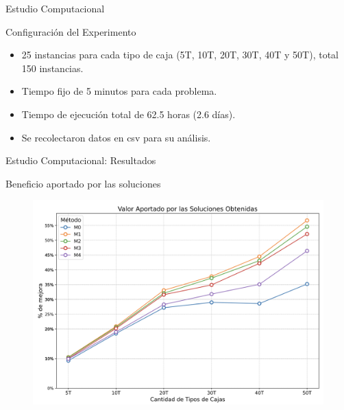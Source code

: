 \documentclass[handout]{beamer}
\begin{document}
\begin{frame}{Estudio Computacional}
    \begin{exampleblock}{Configuración del Experimento}
        \begin{itemize}[<+-| alert@+>]
            \item 25 instancias para cada tipo de caja (5T, 10T, 20T, 30T, 40T y 50T), total 150 instancias.
            \item Tiempo fijo de 5 minutos para cada problema.
            \item Tiempo de ejecución total de 62.5 horas (2.6 días).
            \item Se recolectaron datos en csv para su análisis.
        \end{itemize}
    \end{exampleblock}
\end{frame}

\begin{frame}{Estudio Computacional: Resultados}
    \begin{exampleblock}{Beneficio aportado por las soluciones}
        \begin{figure}
            \centering
            \includegraphics[width=0.8\linewidth]{pic/exp-valor-aportado.png}
            \label{fig:valor-aportado}
        \end{figure}
    \end{exampleblock}
\end{frame}
\end{document}
